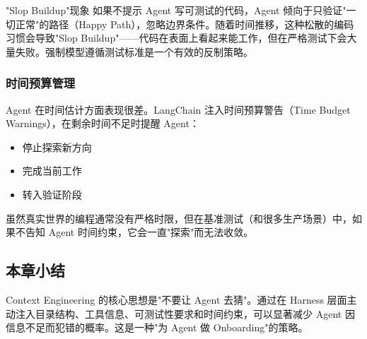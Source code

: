 \begin{warningbox}{"Slop Buildup"现象}
如果不提示 Agent 写可测试的代码，Agent 倾向于只验证"一切正常"的路径（Happy Path），忽略边界条件。随着时间推移，这种松散的编码习惯会导致"Slop Buildup"——代码在表面上看起来能工作，但在严格测试下会大量失败。强制模型遵循测试标准是一个有效的反制策略。
\end{warningbox}

\subsubsection{时间预算管理}

Agent 在时间估计方面表现很差。LangChain 注入时间预算警告（Time Budget Warnings），在剩余时间不足时提醒 Agent：
\begin{itemize}[leftmargin=1.5em]
    \item 停止探索新方向
    \item 完成当前工作
    \item 转入验证阶段
\end{itemize}

虽然真实世界的编程通常没有严格时限，但在基准测试（和很多生产场景）中，如果不告知 Agent 时间约束，它会一直"探索"而无法收敛。

\subsection{本章小结}

Context Engineering 的核心思想是"不要让 Agent 去猜"。通过在 Harness 层面主动注入目录结构、工具信息、可测试性要求和时间约束，可以显著减少 Agent 因信息不足而犯错的概率。这是一种"为 Agent 做 Onboarding"的策略。


